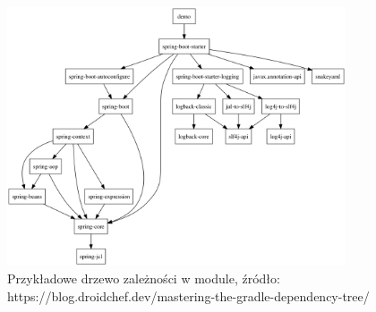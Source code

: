 \begin{figure}[H]
    \centering
    \clearpage
    \includegraphics[width=10cm,keepaspectratio]{rysunki/gradle-deps-tree.png}
    \caption{Przykładowe drzewo zależności w module, źródło: https://blog.droidchef.dev/mastering-the-gradle-dependency-tree/}
    \label{fig:module-deps-tree}
\end{figure}

